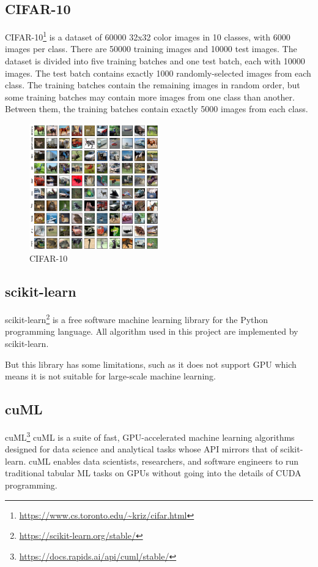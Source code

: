 \documentclass[11pt]{article}
\begin{document}
\subsection{CIFAR-10}
CIFAR-10\footnote{\url{https://www.cs.toronto.edu/~kriz/cifar.html}} is a dataset of 60000 32x32 color images in 10 classes, with 6000 images per class. 
There are 50000 training images and 10000 test images. The dataset is divided into five training batches and one test batch, each with 10000 images. 
The test batch contains exactly 1000 randomly-selected images from each class. 
The training batches contain the remaining images in random order, but some training batches may contain more images from one class than another. 
Between them, the training batches contain exactly 5000 images from each class. 
\begin{figure}[h]
    \centering
    \includegraphics[width=0.5\textwidth]{color.png}
    \caption{CIFAR-10}
    \label{fig:cifar10}
\end{figure}
\subsection{scikit-learn\cite{scikit-learn}}

scikit-learn\footnote{\url{https://scikit-learn.org/stable/}} is a free software machine learning library for the Python programming language. All algorithm used in this project are implemented by scikit-learn.  

But this library has some limitations, such as it does not support GPU which means it is not suitable for large-scale machine learning.

\subsection{cuML}
cuML\footnote{\url{https://docs.rapids.ai/api/cuml/stable/}} cuML is a suite of fast, GPU-accelerated machine learning algorithms designed for data science and analytical tasks whose API mirrors that of scikit-learn. cuML enables data scientists, researchers, and software engineers to run traditional tabular ML tasks on GPUs without going into the details of CUDA programming.
\end{document}
